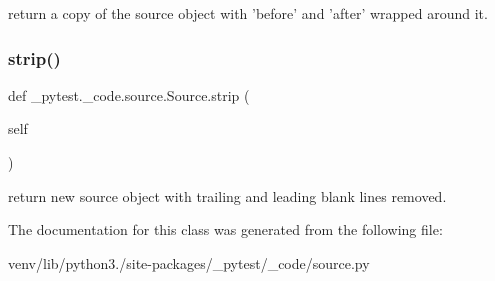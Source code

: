 \begin{DoxyVerb}return a copy of the source object with
    'before' and 'after' wrapped around it.
\end{DoxyVerb}
 \mbox{\label{class__pytest_1_1__code_1_1source_1_1_source_ad993e2ff059420bab5e5f3a4c237c21c}} 
\subsubsection{\texorpdfstring{strip()}{strip()}}
{\footnotesize\ttfamily def \+\_\+pytest.\+\_\+code.\+source.\+Source.\+strip (\begin{DoxyParamCaption}\item[{}]{self }\end{DoxyParamCaption})}

\begin{DoxyVerb}return new source object with trailing
    and leading blank lines removed.
\end{DoxyVerb}
 

The documentation for this class was generated from the following file\+:\begin{DoxyCompactItemize}
\item 
venv/lib/python3./site-\/packages/\+\_\+pytest/\+\_\+code/source.\+py\end{DoxyCompactItemize}
